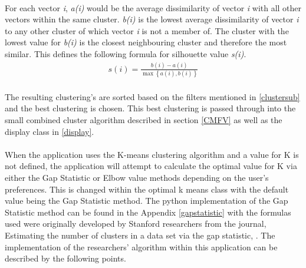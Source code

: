 \paragraph{}For each vector \textit{i}, \textit{a(i)} would be the average dissimilarity of vector \textit{i} with all other vectors within the same cluster. \textit{b(i)} is the lowest average dissimilarity of vector \textit{i} to any other cluster of which vector \textit{i} is not a member of. The cluster with the lowest value for \textit{b(i)} is the closest neighbouring cluster and therefore the most similar. This defines the following formula for silhouette value \textit{s(i)}.\linebreak
\begin{align*}
s\left( i \right) = \frac{{b\left( i \right) - a\left( i \right)}}{{\max \left\{ {a\left( i \right),b\left( i \right)} \right\}}}
\end{align*}

\paragraph{}The resulting clustering's are sorted based on the filters mentioned in \ref{clustersub} and the best clustering is chosen. This best clustering is passed through into the small combined cluster algorithm described in section \ref{CMFV} as well as the display class in \ref{display}.

\paragraph{}When the application uses the K-means clustering algorithm and a value for K is not defined, the application will attempt to calculate the optimal value for K via either the Gap Statistic or Elbow value methods depending on the user's preferences. This is changed within the optimal k means class with the default value being the Gap Statistic method. The python implementation of the Gap Statistic method can be found in the Appendix \ref{gapstatistic} with the formulas used were originally developed by Stanford researchers from the journal, Estimating the number of clusters in a data set via the gap statistic, \cite{gapref}. The implementation of the researchers' algorithm within this application can be described by the following points.

